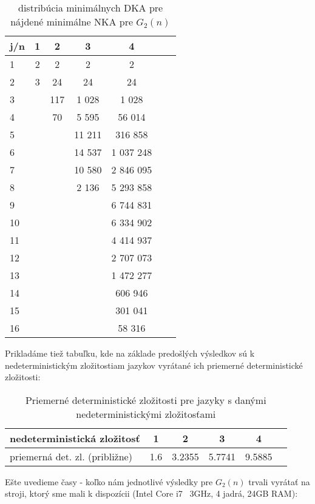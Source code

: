 \begin{table}[H]
  \centering
  \begin{tabular}{|l|c|c|c|c|c|r|}
    \hline
    j/n & 1 & 2 & 3 & 4 \\
    \hline
    1 & 2 & 2 & 2 & 2 \\
    \hline
    2 & 3 & 24 & 24 & 24 \\
    \hline
    3 & & 117 & 1 028 & 1 028 \\
    \hline
    4 & & 70 & 5 595 & 56 014 \\
    \hline 
    5 & & & 11 211 & 316 858 \\
    \hline
    6 & & & 14 537 & 1 037 248 \\
    \hline
    7 & & & 10 580 & 2 846 095 \\
    \hline
    8 & & & 2 136 & 5 293 858 \\
    \hline
    9 & & & & 6 744 831 \\
    \hline
    10 & & & & 6 334 902 \\
    \hline
    11 & & & & 4 414 937 \\
    \hline
    12 & & & & 2 707 073 \\
    \hline
    13 & & & & 1 472 277 \\
    \hline
    14 & & & & 606 946 \\
    \hline
    15 & & & & 301 041 \\
    \hline
    16 & & & & 58 316 \\
    \hline
  \end{tabular}
  \caption{distribúcia minimálnych DKA pre nájdené minimálne NKA pre $G_2(n)$}
\end{table}

Prikladáme tiež tabuľku, kde na základe predošlých výsledkov sú k nedeterministickým zložitostiam jazykov vyrátané ich priemerné deterministické zložitosti:

\begin{table}[H]
  \centering
  \begin{tabular}{|l|c|c|c|c|r|}
    \hline
    nedeterministická  zložitosť & 1 & 2 & 3 & 4 \\ 
    \hline
    priemerná det. zl. (približne) & 1.6 & 3.2355 & 5.7741 & 9.5885 \\ 
    \hline
  \end{tabular}
  \caption{Priemerné deterministické zložitosti pre jazyky s danými nedeterministickými zložitosťami}
\end{table}


Ešte uvedieme časy - koľko nám jednotlivé výsledky pre $G_2(n)$ trvali vyrátať na stroji, ktorý sme mali k dispozícii (Intel Core i7 ~3GHz, 4 jadrá, 24GB RAM):

